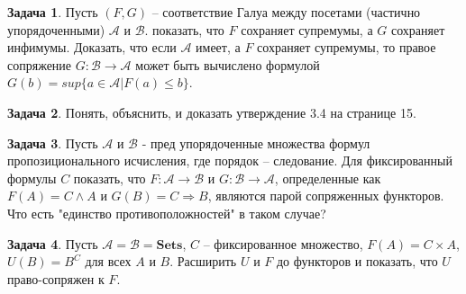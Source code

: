 \documentclass[10pt]{article}
\theoremstyle{definition}
\newtheorem{Pm}{Задача}[subsection]
\begin{document}
\begin{Pm}
    Пусть $(F, G)$ -- соответствие Галуа между посетами (частично упорядоченными) $\mathcal A$ и $\mathcal B$. показать, что $F$ сохраняет супремумы, а $G$ сохраняет инфимумы. Доказать, что если $\mathcal A$ имеет, а $F$ сохраняет супремумы, то правое сопряжение $G : \mathcal B \rightarrow \mathcal A$ может быть вычислено формулой $G(b) = sup \{a \in \mathcal A | F(a) \leq b \}$.
\end{Pm}

\begin{Pm}
    Понять, объяснить, и доказать утверждение 3.4 на странице 15.
\end{Pm}

\begin{Pm}
    Пусть $\mathcal A$ и $\mathcal B$ - пред упорядоченные множества формул пропозиционального исчисления, где порядок -- следование. Для фиксированный формулы $C$ показать, что $F : \mathcal A \rightarrow \mathcal B$ и $G : \mathcal B \rightarrow \mathcal A$, определенные как $F(A) = C \land A$ и $G(B) = C \Rightarrow B$, являются парой сопряженных функторов. Что есть "единство противоположностей" в таком случае?
\end{Pm}

\begin{Pm}
    Пусть $\mathcal A = \mathcal B = \mathbf{Sets}$, $C$ -- фиксированное множество, $F(A) = C \times A$, $U(B) = B^C$ для всех $A$ и $B$. Расширить $U$ и $F$ до функторов и показать, что $U$ право-сопряжен к $F$.
\end{Pm}
\end{document}
